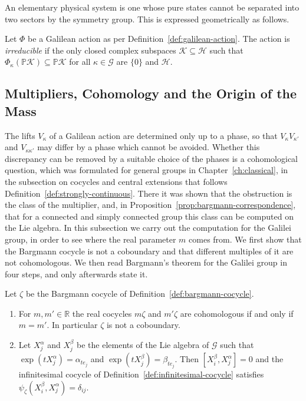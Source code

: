 An elementary physical system is one whose pure states cannot be separated into two sectors by the symmetry group. This is expressed geometrically as follows.

\begin{definition}\label{def:irreducible-action}
	Let $\Phi$ be a Galilean action as per Definition~\ref{def:galilean-action}. The action is \emph{irreducible} if the only closed complex subspaces $\mathcal{K}\subseteq\mathcal{H}$ such that $\Phi_\kappa(\mathbb{P}\mathcal{K})\subseteq\mathbb{P}\mathcal{K}$ for all $\kappa\in\mathcal{G}$ are $\{0\}$ and $\mathcal{H}$.
\end{definition}

\subsection*{Multipliers, Cohomology and the Origin of the Mass}

The lifts $V_\kappa$ of a Galilean action are determined only up to a phase, so that $V_\kappa V_{\kappa'}$ and $V_{\kappa\kappa'}$ may differ by a phase which cannot be avoided. Whether this discrepancy can be removed by a suitable choice of the phases is a cohomological question, which was formulated for general groups in Chapter~\ref{ch:classical}, in the subsection on cocycles and central extensions that follows Definition~\ref{def:strongly-continuous}. There it was shown that the obstruction is the class of the multiplier, and, in Proposition~\ref{prop:bargmann-correspondence}, that for a connected and simply connected group this class can be computed on the Lie algebra. In this subsection we carry out the computation for the Galilei group, in order to see where the real parameter $m$ comes from. We first show that the Bargmann cocycle is not a coboundary and that different multiples of it are not cohomologous. We then read Bargmann's theorem for the Galilei group in four steps, and only afterwards state it.

\begin{proposition}\label{prop:bargmann-nontrivial}
	Let $\zeta$ be the Bargmann cocycle of Definition~\ref{def:bargmann-cocycle}.
	\begin{enumerate}
		\item For $m,m'\in\mathbb{R}$ the real cocycles $m\zeta$ and $m'\zeta$ are cohomologous if and only if $m=m'$. In particular $\zeta$ is not a coboundary.
		\item Let $X^\alpha_j$ and $X^\beta_j$ be the elements of the Lie algebra of $\mathcal{G}$ such that $\exp(tX^\alpha_j)=\alpha_{te_j}$ and $\exp(tX^\beta_j)=\beta_{te_j}$. Then $[X^\beta_i,X^\alpha_j]=0$ and the infinitesimal cocycle of Definition~\ref{def:infinitesimal-cocycle} satisfies $\psi_\zeta(X^\beta_i,X^\alpha_j)=\delta_{ij}$.
	\end{enumerate}
\end{proposition}

